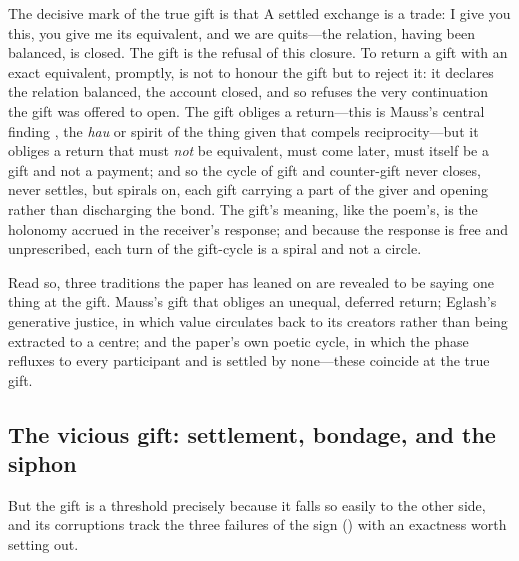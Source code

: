 The decisive mark of the true gift is that  A settled exchange is a trade: I give you this, you give me its equivalent, and we are quits---the relation, having been balanced, is closed. The gift is the refusal of this closure. To return a gift with an exact equivalent, promptly, is not to honour the gift but to reject it: it declares the relation balanced, the account closed, and so refuses the very continuation the gift was offered to open. The gift obliges a return---this is Mauss's central finding \parencite{mauss1990}, the \emph{hau} or spirit of the thing given that compels reciprocity---but it obliges a return that must \emph{not} be equivalent, must come later, must itself be a gift and not a payment; and so the cycle of gift and counter-gift never closes, never settles, but spirals on, each gift carrying a part of the giver and opening rather than discharging the bond.  The gift's meaning, like the poem's, is the holonomy accrued in the receiver's response; and because the response is free and unprescribed, each turn of the gift-cycle is a spiral and not a circle.

Read so, three traditions the paper has leaned on are revealed to be saying one thing at the gift. Mauss's gift that obliges an unequal, deferred return; Eglash's generative justice, in which value circulates back to its creators rather than being extracted to a centre; and the paper's own poetic cycle, in which the phase refluxes to every participant and is settled by none---these coincide at the true gift. 

\subsection{The vicious gift: settlement, bondage, and the siphon}
\label{p09:sec:vicious-gift}

But the gift is a threshold precisely because it falls so easily to the other side, and its corruptions track the three failures of the sign () with an exactness worth setting out.

